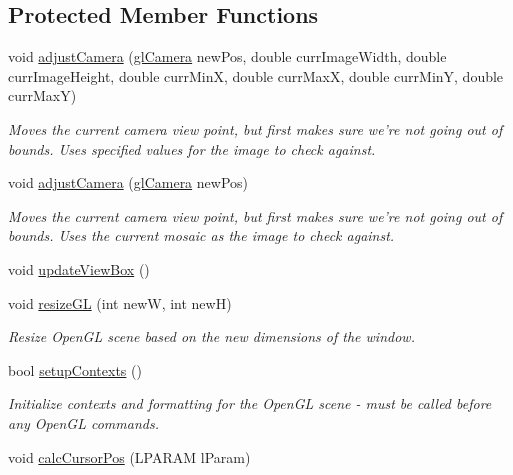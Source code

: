 \subsection*{Protected Member Functions}
\begin{DoxyCompactItemize}
\item 
\hypertarget{class_mosaic_base_afd97e8814dd0d5a6388ee4ad86fef234}{
void \hyperlink{class_mosaic_base_afd97e8814dd0d5a6388ee4ad86fef234}{adjustCamera} (\hyperlink{classgl_camera}{glCamera} newPos, double currImageWidth, double currImageHeight, double currMinX, double currMaxX, double currMinY, double currMaxY)}
\label{class_mosaic_base_afd97e8814dd0d5a6388ee4ad86fef234}

\begin{DoxyCompactList}\small\item\em Moves the current camera view point, but first makes sure we're not going out of bounds. Uses specified values for the image to check against. \end{DoxyCompactList}\item 
\hypertarget{class_mosaic_base_a27cf4cea213eecd9354522c5fb0ee5f2}{
void \hyperlink{class_mosaic_base_a27cf4cea213eecd9354522c5fb0ee5f2}{adjustCamera} (\hyperlink{classgl_camera}{glCamera} newPos)}
\label{class_mosaic_base_a27cf4cea213eecd9354522c5fb0ee5f2}

\begin{DoxyCompactList}\small\item\em Moves the current camera view point, but first makes sure we're not going out of bounds. Uses the current mosaic as the image to check against. \end{DoxyCompactList}\item 
void \hyperlink{class_mosaic_base_a19162a8c03a7555b8aea3cbb5bb40db9}{updateViewBox} ()
\item 
void \hyperlink{class_mosaic_base_aa40da6c1d73e45023971dbaf8f7be95e}{resizeGL} (int newW, int newH)
\begin{DoxyCompactList}\small\item\em Resize OpenGL scene based on the new dimensions of the window. \end{DoxyCompactList}\item 
bool \hyperlink{class_mosaic_base_a74a8a3299be4793a00cb33bdf32b3308}{setupContexts} ()
\begin{DoxyCompactList}\small\item\em Initialize contexts and formatting for the OpenGL scene -\/ must be called before any OpenGL commands. \end{DoxyCompactList}\item 
void \hyperlink{class_mosaic_base_ab426c891209b8da2f04de998a0268aa3}{calcCursorPos} (LPARAM lParam)
\end{DoxyCompactItemize}

